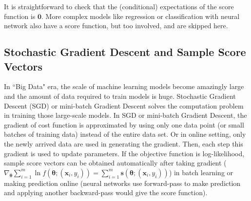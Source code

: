 \documentclass[twoside,11pt]{article}
\begin{document}

It is straightforward to check that the (conditional) expectations of the score function is $\bm {0}$. More complex models like regression or classification with neural network also have a score function, but too involved, and are skipped here. 

\subsection{Stochastic Gradient Descent and Sample Score Vectors}
\label{ss:sgd_score}
%

In ``Big Data" era, the scale of machine learning models become amazingly large and the amount of data required to train models is huge. Stochastic Gradient Descent (SGD) or mini-batch Gradient Descent solves the computation problem in training those large-scale models. In SGD or mini-batch Gradient Descent, the gradient of cost function is approximated by using only one data point (or small batches of training data) instead of the entire data set. Or in online setting, only the newly arrived data are used in generating the gradient. Then, each step this gradient is used to update parameters. If the objective function is log-likelihood, sample score vectors can be obtained automatically after taking gradient ($\nabla _{\bm { \theta}} \sum _{i=1} ^{m} \ln f(\bm{\theta}; (\bm {x}_i, y_i)) = \sum _{i=1} ^{m} \bm{s}(\bm { \theta};(\bm {x}_i, y_i))$) in batch learning or making prediction online (neural networks use forward-pass to make prediction and applying another backward-pass would give the score function). 
\end{document}
